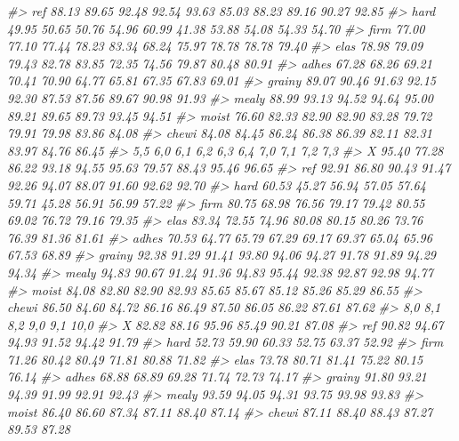 \documentclass[
]{article}
\newenvironment{Shaded}{\begin{snugshade}}{\end{snugshade}}
\newcommand{\CommentTok}[1]{\textcolor[rgb]{0.56,0.35,0.01}{\textit{#1}}}
\begin{document}
\begin{Shaded}
\begin{Highlighting}[]
\CommentTok{\#\textgreater{} ref     88.13  89.65  92.48  92.54  93.63  85.03  88.23  89.16  90.27  92.85}
\CommentTok{\#\textgreater{} hard    49.95  50.65  50.76  54.96  60.99  41.38  53.88  54.08  54.33  54.70}
\CommentTok{\#\textgreater{} firm    77.00  77.10  77.44  78.23  83.34  68.24  75.97  78.78  78.78  79.40}
\CommentTok{\#\textgreater{} elas    78.98  79.09  79.43  82.78  83.85  72.35  74.56  79.87  80.48  80.91}
\CommentTok{\#\textgreater{} adhes   67.28  68.26  69.21  70.41  70.90  64.77  65.81  67.35  67.83  69.01}
\CommentTok{\#\textgreater{} grainy  89.07  90.46  91.63  92.15  92.30  87.53  87.56  89.67  90.98  91.93}
\CommentTok{\#\textgreater{} mealy   88.99  93.13  94.52  94.64  95.00  89.21  89.65  89.73  93.45  94.51}
\CommentTok{\#\textgreater{} moist   76.60  82.33  82.90  82.90  83.28  79.72  79.91  79.98  83.86  84.08}
\CommentTok{\#\textgreater{} chewi   84.08  84.45  86.24  86.38  86.39  82.11  82.31  83.97  84.76  86.45}
\CommentTok{\#\textgreater{}           5,5    6,0    6,1    6,2    6,3    6,4    7,0    7,1    7,2    7,3}
\CommentTok{\#\textgreater{} X       95.40  77.28  86.22  93.18  94.55  95.63  79.57  88.43  95.46  96.65}
\CommentTok{\#\textgreater{} ref     92.91  86.80  90.43  91.47  92.26  94.07  88.07  91.60  92.62  92.70}
\CommentTok{\#\textgreater{} hard    60.53  45.27  56.94  57.05  57.64  59.71  45.28  56.91  56.99  57.22}
\CommentTok{\#\textgreater{} firm    80.75  68.98  76.56  79.17  79.42  80.55  69.02  76.72  79.16  79.35}
\CommentTok{\#\textgreater{} elas    83.34  72.55  74.96  80.08  80.15  80.26  73.76  76.39  81.36  81.61}
\CommentTok{\#\textgreater{} adhes   70.53  64.77  65.79  67.29  69.17  69.37  65.04  65.96  67.53  68.89}
\CommentTok{\#\textgreater{} grainy  92.38  91.29  91.41  93.80  94.06  94.27  91.78  91.89  94.29  94.34}
\CommentTok{\#\textgreater{} mealy   94.83  90.67  91.24  91.36  94.83  95.44  92.38  92.87  92.98  94.77}
\CommentTok{\#\textgreater{} moist   84.08  82.80  82.90  82.93  85.65  85.67  85.12  85.26  85.29  86.55}
\CommentTok{\#\textgreater{} chewi   86.50  84.60  84.72  86.16  86.49  87.50  86.05  86.22  87.61  87.62}
\CommentTok{\#\textgreater{}           8,0    8,1    8,2    9,0    9,1   10,0}
\CommentTok{\#\textgreater{} X       82.82  88.16  95.96  85.49  90.21  87.08}
\CommentTok{\#\textgreater{} ref     90.82  94.67  94.93  91.52  94.42  91.79}
\CommentTok{\#\textgreater{} hard    52.73  59.90  60.33  52.75  63.37  52.92}
\CommentTok{\#\textgreater{} firm    71.26  80.42  80.49  71.81  80.88  71.82}
\CommentTok{\#\textgreater{} elas    73.78  80.71  81.41  75.22  80.15  76.14}
\CommentTok{\#\textgreater{} adhes   68.88  68.89  69.28  71.74  72.73  74.17}
\CommentTok{\#\textgreater{} grainy  91.80  93.21  94.39  91.99  92.91  92.43}
\CommentTok{\#\textgreater{} mealy   93.59  94.05  94.31  93.75  93.98  93.83}
\CommentTok{\#\textgreater{} moist   86.40  86.60  87.34  87.11  88.40  87.14}
\CommentTok{\#\textgreater{} chewi   87.11  88.40  88.43  87.27  89.53  87.28}
\end{Highlighting}
\end{Shaded}
\end{document}
